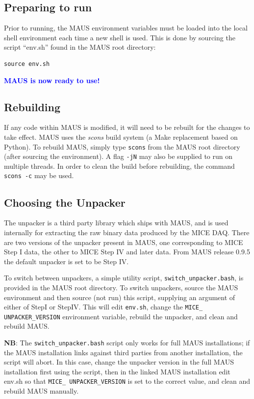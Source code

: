 \documentclass[a4paper,10pt]{article}
\begin{document}
  \subsection{Preparing to run}
    Prior to running, the MAUS environment variables must be loaded into the local shell environment each time a new shell is used.  This is done by sourcing the script ``env.sh'' found in the MAUS root directory:
    \begin{lstlisting}
source env.sh
    \end{lstlisting}
    \textbf{\textcolor{blue}{MAUS is now ready to use!}}
    
  \subsection{Rebuilding}
  If any code within MAUS is modified, it will need to be rebuilt for the changes to take effect. MAUS uses the \textit{scons} build system (a Make replacement based on Python). To rebuild MAUS, simply type \texttt{scons} from the MAUS root directory (after sourcing the environment). A flag \texttt{-jN} may also be supplied to run on multiple threads. In order to clean the build before rebuilding, the command \texttt{scons -c} may be used.
  
  \subsection{Choosing the Unpacker}
  The unpacker is a third party library which ships with MAUS, and is used internally for extracting the raw binary data produced by the MICE DAQ. There are two versions of the unpacker present in MAUS, one corresponding to MICE Step I data, the other to MICE Step IV and later data. From MAUS release 0.9.5 the default unpacker is set to be Step IV.

  To switch between unpackers, a simple utility script, \texttt{switch\_unpacker.bash}, is provided in the MAUS root directory. To switch unpackers, source the MAUS environment and then source (not run) this script, supplying an argument of either of StepI or StepIV. This will edit \texttt{env.sh}, change the \texttt{MICE\_ UNPACKER\_VERSION} environment variable, rebuild the unpacker, and clean and rebuild MAUS.

  \textbf{NB}: The \texttt{switch\_unpacker.bash} script only works for full MAUS installations; if the MAUS installation links against third parties from another installation, the script will abort.  In this case, change the unpacker version in the full MAUS installation first using the script, then in the linked MAUS installation edit env.sh so that \texttt{MICE\_ UNPACKER\_VERSION} is set to the correct value, and clean and rebuild MAUS manually.
\end{document}
